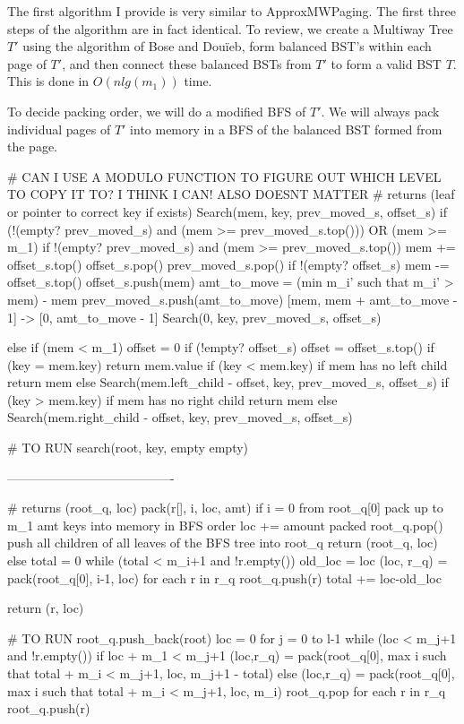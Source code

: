 \documentclass[letterpaper,12pt,titlepage,oneside,final]{book}
\theoremstyle{plain}
\begin{document}
The first algorithm I provide is very similar to ApproxMWPaging. The first three steps of the algorithm are in fact identical. To review, we create a Multiway Tree $T'$ using the algorithm of Bose and Dou\"{i}eb, form balanced BST's within each page of $T'$, and then connect these balanced BSTs from $T'$ to form a valid BST $T$. This is done in $O(n lg(m_1))$ time. 

To decide packing order, we will do a modified BFS of $T'$. We will always pack individual pages of $T'$ into memory in a BFS of the balanced BST formed from the page. 

\iffalse
# CAN I USE A MODULO FUNCTION TO FIGURE OUT WHICH LEVEL TO COPY IT TO? I THINK I CAN! ALSO DOESNT MATTER
# returns (leaf or pointer to correct key if exists)
Search(mem, key, prev_moved_s, offset_s)
	if (!(empty? prev_moved_s) and (mem >= prev_moved_s.top())) OR (mem >= m_1)
		if !(empty? prev_moved_s) and (mem >= prev_moved_s.top())
			mem += offset_s.top()
			offset_s.pop()
			prev_moved_s.pop()
			if !(empty? offset_s)
				mem -= offset_s.top()			
		offset_s.push(mem)
		amt_to_move = (min m_i' such that m_i' > mem) - mem
		prev_moved_s.push(amt_to_move)
		[mem, mem + amt_to_move - 1] -> [0, amt_to_move - 1]
		Search(0, key, prev_moved_s, offset_s)
	
	else if (mem < m_1)
		offset = 0
		if (!empty? offset_s)
			offset = offset_s.top()
		if (key = mem.key) return mem.value
		if (key < mem.key) 
			if mem has no left child
				return mem
			else
				Search(mem.left_child - offset, key, prev_moved_s, offset_s)
		if (key > mem.key) 
			if mem has no right child
				return mem
			else
				Search(mem.right_child - offset, key, prev_moved_s, offset_s)


# TO RUN
search(root, key, empty empty)


----------------------------------------

# returns (root_q, loc)
pack(r[], i, loc, amt)
	if i = 0
		from root_q[0] pack up to m_1 amt keys into memory in BFS order
		loc += amount packed
		root_q.pop()
		push all children of all leaves of the BFS tree into root_q
		return (root_q, loc)
	else
		total = 0
		while (total < m_{i+1} and !r.empty())
			old_loc = loc
			(loc, r_q) = pack(root_q[0], i-1, loc)
			for each r in r_q root_q.push(r)
			total += loc-old_loc

		return (r, loc)

# TO RUN
root_q.push_back(root)
loc = 0
for j = 0 to l-1
	while (loc < m_{j+1} and !r.empty())
		if loc + m_1 < m_{j+1}
			(loc,r_q) = pack(root_q[0], max i such that total + m_i < m_{j+1}, loc, m_{j+1} - total)
		else
			(loc,r_q) = pack(root_q[0], max i such that total + m_i < m_{j+1}, loc, m_i)
		root_q.pop
		for each r in r_q root_q.push(r)
	
\end{document}
